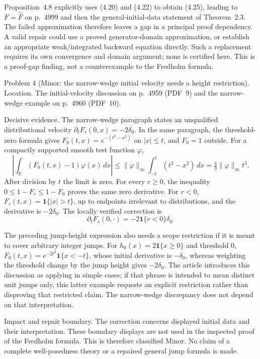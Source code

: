 \documentclass[10pt]{article}
\begin{document}
Proposition 4.8 explicitly uses (4.20) and (4.22) to obtain (4.25), leading to \(F=\widehat F\) on p. 4999 and then the general-initial-data statement of Theorem 2.3. The failed approximation therefore leaves a gap in a principal proof dependency. A valid repair could use a proved generator-domain approximation, or establish an appropriate weak/integrated backward equation directly. Such a replacement requires its own convergence and domain argument; none is certified here. This is a proof-gap finding, not a counterexample to the Fredholm formula.\par
Problem 4 (Minor: the narrow-wedge initial velocity needs a height restriction).  Location. The initial-velocity discussion on p. 4959 (PDF 9) and the narrow-wedge example on p. 4960 (PDF 10).\par
Decisive evidence. The narrow-wedge paragraph states an unqualified distributional velocity \(\partial_tF_r(0,x)=-2\delta_0\). In the same paragraph, the threshold-zero formula gives \(F_0(t,x)=e^{-(t^2-x^2)}\) on \(|x|\leq t\), and \(F_0=1\) outside. For a compactly supported smooth test function \(\varphi\), \[\left|\int_{\mathbb R}(F_0(t,x)-1)\varphi(x)\,dx\right|
\leq\|\varphi\|_\infty\int_{-t}^t(t^2-x^2)\,dx
=\tfrac43\|\varphi\|_\infty t^3.\] After division by \(t\) the limit is zero. For every \(r\geq0\), the inequality \(0\leq1-F_r\leq1-F_0\) proves the same zero derivative. For \(r<0\), \(F_r(t,x)=\mathbf 1\{|x|>t\}\), up to endpoints irrelevant to distributions, and the derivative is \(-2\delta_0\). The locally verified correction is \[\partial_t F_r(0,\cdot)=-2\mathbf 1\{r<0\}\delta_0.\]\par
The preceding jump-height expression also needs a scope restriction if it is meant to cover arbitrary integer jumps. For \(h_0(x)=2\mathbf 1\{x\geq0\}\) and threshold \(0\), \(F_0(t,x)=e^{-2t^2}\mathbf 1\{x<-t\}\), whose initial derivative is \(-\delta_0\), whereas weighting the threshold change by the jump height gives \(-2\delta_0\). The article introduces this discussion as applying in simple cases; if that phrase is intended to mean distinct unit jumps only, this latter example requests an explicit restriction rather than disproving that restricted claim. The narrow-wedge discrepancy does not depend on that interpretation.\par
Impact and repair boundary. The correction concerns displayed initial data and their interpretation. These boundary displays are not used in the inspected proof of the Fredholm formula. This is therefore classified Minor. No claim of a complete well-posedness theory or a repaired general jump formula is made.\par
\end{document}
